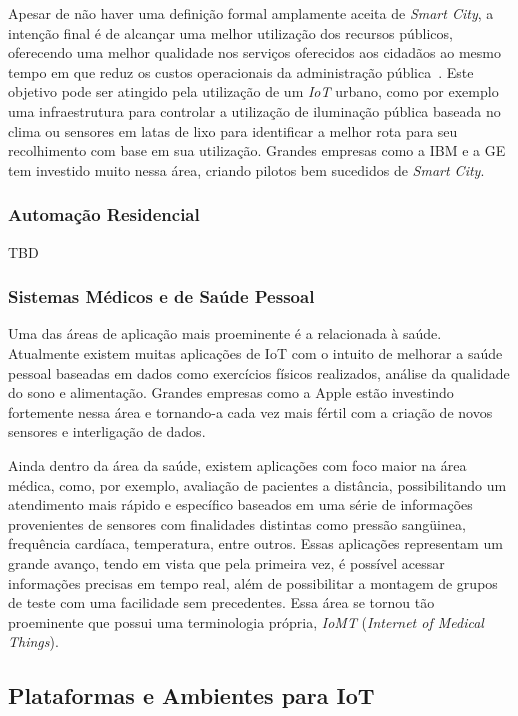 Apesar de não haver uma definição formal amplamente aceita de \textit{Smart City}, a intenção final é de
alcançar uma melhor utilização dos recursos públicos, oferecendo uma melhor qualidade nos serviços oferecidos
aos cidadãos ao mesmo tempo em que reduz os custos operacionais da administração pública~\cite{IoTSmart2014}.
Este objetivo pode ser atingido pela utilização de um \textit{IoT} urbano, como por exemplo uma infraestrutura
para controlar a utilização de iluminação pública baseada no clima ou sensores em latas de lixo para
identificar a melhor rota para seu recolhimento com base em sua utilização. Grandes empresas como a
IBM e a GE tem investido muito nessa área, criando pilotos bem sucedidos de \textit{Smart City}.

\subsubsection{Automação Residencial}
TBD

\subsubsection{Sistemas Médicos e de Saúde Pessoal}
Uma das áreas de aplicação mais proeminente é a relacionada à saúde. Atualmente existem muitas aplicações
de IoT com o intuito de melhorar a saúde pessoal baseadas em dados como exercícios físicos realizados,
análise da qualidade do sono e alimentação. Grandes empresas como a Apple estão investindo fortemente nessa
área e tornando-a cada vez mais fértil com a criação de novos sensores e interligação de dados.

Ainda dentro da área da saúde, existem aplicações com foco maior na área médica, como, por exemplo,
avaliação de pacientes a distância, possibilitando um atendimento mais rápido e específico baseados em uma
série de informações provenientes de sensores com finalidades distintas como pressão sangüinea,
frequência cardíaca, temperatura, entre outros. Essas aplicações representam um grande avanço, tendo
em vista que pela primeira vez, é possível acessar informações precisas em tempo real, além de possibilitar
a montagem de grupos de teste com uma facilidade sem precedentes. Essa área se tornou tão proeminente que
possui uma terminologia própria, \textit{IoMT} (\textit{Internet of Medical Things}).


\subsection{Plataformas e Ambientes para IoT}
\label{sec:IoTPlataformas}

